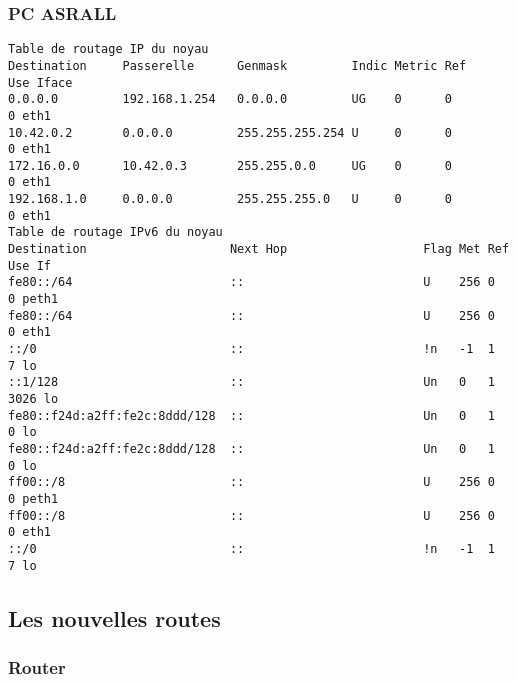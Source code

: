 \newpage

		\subsubsection{\label{routeASRALL}PC ASRALL}
		\vspace{0.3cm}

\begin{verbatim}
Table de routage IP du noyau
Destination     Passerelle      Genmask         Indic Metric Ref    Use Iface
0.0.0.0         192.168.1.254   0.0.0.0         UG    0      0        0 eth1
10.42.0.2       0.0.0.0         255.255.255.254 U     0      0        0 eth1
172.16.0.0      10.42.0.3       255.255.0.0     UG    0      0        0 eth1
192.168.1.0     0.0.0.0         255.255.255.0   U     0      0        0 eth1
Table de routage IPv6 du noyau
Destination                    Next Hop                   Flag Met Ref Use If
fe80::/64                      ::                         U    256 0     0 peth1
fe80::/64                      ::                         U    256 0     0 eth1
::/0                           ::                         !n   -1  1     7 lo
::1/128                        ::                         Un   0   1  3026 lo
fe80::f24d:a2ff:fe2c:8ddd/128  ::                         Un   0   1     0 lo
fe80::f24d:a2ff:fe2c:8ddd/128  ::                         Un   0   1     0 lo
ff00::/8                       ::                         U    256 0     0 peth1
ff00::/8                       ::                         U    256 0     0 eth1
::/0                           ::                         !n   -1  1     7 lo
\end{verbatim}

\newpage

		\subsection{\label{newRoute}Les nouvelles routes}
			\subsubsection{Router}
			\vspace{0.3cm}

